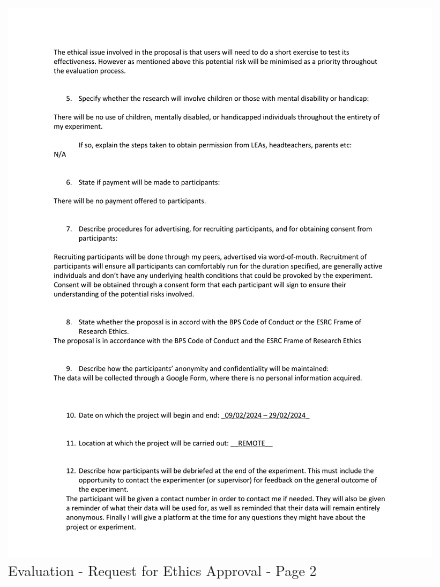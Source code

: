 \documentclass{l4proj}
\begin{document}
\begin{figure}[h!]
    \centering
    \includegraphics[width=1\linewidth]{dissertation//dissImages/RequestforEthicsApprovalpage2.pdf}
    \caption{Evaluation - Request for Ethics Approval - Page 2}
\end{figure}
\end{document}
